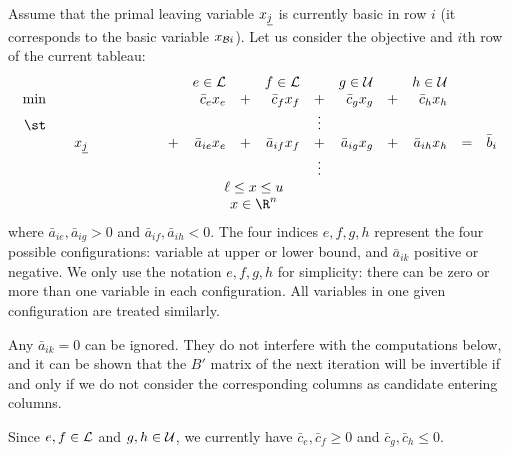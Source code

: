 Assume that the primal leaving variable $x_{\underline{j}}$ is currently
basic in row $i$ (it corresponds to the basic variable $x_{\mathcal{B} i}$).
Let us consider the objective and $i$th row of the current tableau:
\newcommand{\cb}[0]{\bar c}
\newcommand{\ab}[0]{\bar a}
\[
\begin{array}{rclcrcrcrcrcl}
     &&              &   & e \in \NL    &   & f \in \NL    &   & g \in \NU     &   & h \in \NU    &   & \\
\min &&              &   & \cb_e x_e    & + & \cb_f x_f    & + & \cb_g x_g     & + & \cb_h x_h    &   & \\
\st  && \hspace{2cm} &   &              &   &              & \vdots \\
     && x_{\uj}      & + & \ab_{ie} x_e & + & \ab_{if} x_f & + & \ab_{ig} x_g  & + & \ab_{ih} x_h & = & \bar b_i \\
     &&              &   &              &   &              & \vdots \\
     & \multicolumn{10}{c}{\ell \leq x \leq u} \\
     & \multicolumn{10}{c}{x \in \R^n}
\end{array}
\]
where $\ab_{ie}, \ab_{ig} > 0$ and $\ab_{if}, \ab_{ih} < 0$.
The four indices $e, f, g, h$ represent the four possible configurations:
variable at upper or lower bound, and $\ab_{ik}$ positive or negative.
We only use the notation $e, f, g, h$ for simplicity:
there can be zero or more than one variable in each configuration.
All variables in one given configuration are treated similarly.

Any $\ab_{ik} = 0$ can be ignored. They do not interfere with the
computations below, and it can be shown that the $B'$ matrix of
the next iteration will be invertible if and only if we do not consider
the corresponding columns as candidate entering columns.

Since $e, f \in \mathcal{L}$ and $g, h \in \mathcal{U}$,
we currently have $\cb_e, \cb_f \geq 0$
and $\cb_g, \cb_h \leq 0$.

